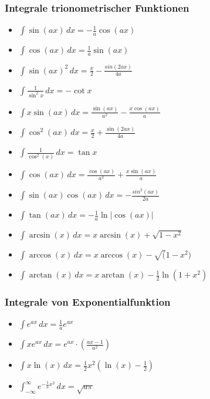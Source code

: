 \subsubsection{Integrale trionometrischer Funktionen}
\begin{itemize}[leftmargin=*]
	\item $\int \sin(ax) \,dx = -\frac{1}{a}\cos(ax)$
	\item $\int \cos(ax) \,dx = \frac{1}{a}\sin(ax)$
	\item $\int \sin(ax)^2 \,dx = \frac{x}{2} - \frac{sin(2ax)}{4a}$
	\item $\int \frac{1}{\sin^2 x} \,dx = -\cot x$
	\item $\int x \sin(ax) \,dx = \frac{\sin(ax)}{a^2} - \frac{x \cos(ax)}{a}$
	\item $\int \cos^2(ax) \,dx = \frac{x}{2} + \frac{\sin(2ax)}{4a}$
	\item $\int \frac{1}{\cos^2(x)} \,dx = \tan x$
	\item $\int \cos(ax) \,dx = \frac{\cos(ax)}{a^2} + \frac{x \sin(ax)}{a}$
	\item $\int \sin(ax) \cos(ax) \,dx = -\frac{sin^2(ax)}{2a}$
	\item $\int \tan(ax) \,dx = - \frac{1}{a} \ln | \cos(ax) |$
	\item $\int \arcsin(x) \,dx = x \arcsin(x) + \sqrt{1 - x^2}$
	\item $\int \arccos(x) \,dx = x \arccos(x) - \sqrt(1-x^2)$
	\item $\int \arctan(x) \,dx = x \arctan(x) - \frac{1}{2} \ln(1+x^2)$
\end{itemize}

\subsubsection{Integrale von Exponentialfunktion}
\begin{itemize}[leftmargin=*]
  	\item $\int e^{ax} \,dx = \frac{1}{a} e^{ax}$ 
	\item $\int x e^{ax} \,dx = e^{ax} \cdot \left ( \frac{ax - 1}{a^2} \right )$
	\item $\int x \ln(x) \,dx = \frac{1}{2} x^2 (\ln(x) - \frac{1}{2})$
	\item $\int_{-\infty}^\infty e^{-\frac{1}{a}x^2} \,dx = \sqrt{a \pi}$
\end{itemize}

